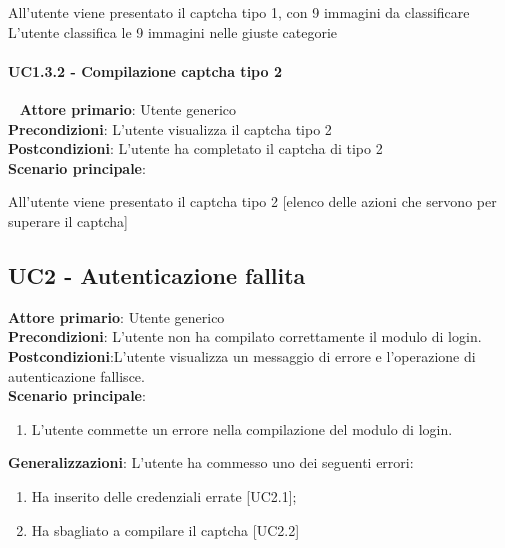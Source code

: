 All'utente viene presentato il captcha tipo 1, con 9 immagini da classificare\\
L'utente classifica le 9 immagini nelle giuste categorie


\paragraph{UC1.3.2 - Compilazione captcha tipo 2}~\smallskip
\textbf{Attore primario}: Utente generico\\
\textbf{Precondizioni}: L'utente visualizza il captcha tipo 2\\
\textbf{Postcondizioni}: L'utente ha completato il captcha di tipo 2\\
\textbf{Scenario principale}:

All'utente viene presentato il captcha tipo 2
[elenco delle azioni che servono per superare il captcha]

\subsection{UC2 - Autenticazione fallita}
\textbf{Attore primario}: Utente generico\\
\textbf{Precondizioni}: L’utente non ha compilato correttamente il modulo di login.\\
\textbf{Postcondizioni}:L’utente visualizza un messaggio di errore e l’operazione di autenticazione fallisce.\\

\textbf{Scenario principale}:
\begin{enumerate}
   \item L’utente commette un errore nella compilazione del modulo di login.
\end{enumerate}

\textbf{Generalizzazioni}: L'utente ha commesso uno dei seguenti errori:
\begin{enumerate}
	\item Ha inserito delle credenziali errate [UC2.1];
	\item Ha sbagliato a compilare il captcha [UC2.2]
\end{enumerate}

